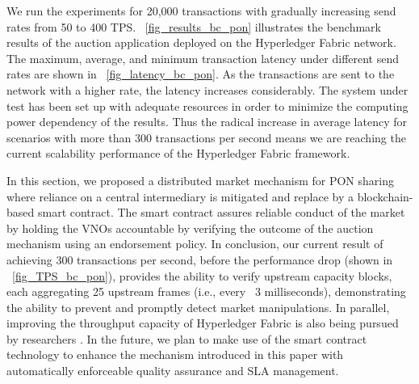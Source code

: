 

We run the experiments for 20,000 transactions with gradually increasing send rates from 50 to 400 \ac{TPS}. \figureautorefname~\ref{fig_results_bc_pon} illustrates the benchmark results of the auction application deployed on the Hyperledger Fabric network. The maximum, average, and minimum transaction latency under different send rates are shown in \figureautorefname~\ref{fig_latency_bc_pon}. As the transactions are sent to the network with a higher rate, the latency increases considerably. The system under test has been set up with adequate resources in order to minimize the computing power dependency of the results. Thus the radical increase in average latency for scenarios with more than 300 transactions per second means we are reaching the current scalability performance of the Hyperledger Fabric framework. %


In this section, we proposed a distributed market mechanism for \ac{PON} sharing where reliance on a central intermediary is mitigated and replace by a blockchain-based smart contract. The smart contract assures reliable conduct of the market by holding the \acp{VNO} accountable by verifying the outcome of the auction mechanism using an endorsement policy.
In conclusion, our current result of achieving 300 transactions per second, before the performance drop (shown in \figureautorefname~\ref{fig_TPS_bc_pon}), provides the ability to verify upstream capacity blocks, each aggregating 25 upstream frames (i.e., every ~3 milliseconds), demonstrating the ability to prevent and promptly detect market manipulations.
In parallel, improving the throughput capacity of Hyperledger Fabric is also being pursued by researchers \cite{Gorenflo_2019}. In the future, we plan to make use of the smart contract technology to enhance the mechanism introduced in this paper with automatically enforceable quality assurance and \ac{SLA} management.





